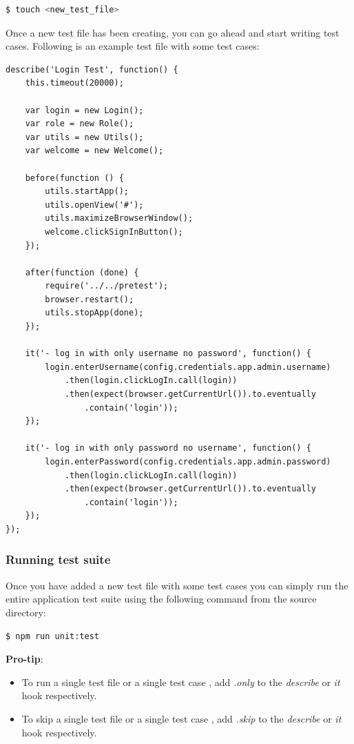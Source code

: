 \documentclass[fontsize=12pt,paper=letter,twoside]{scrartcl}
\begin{document}
\begin{lstlisting}[language=bash]
  $ touch <new_test_file>
\end{lstlisting}

\bigskip
\noindent Once a new test file has been creating, you can go ahead and start writing test cases. Following is an example test file with some test cases:\\

\begin{lstlisting}
describe('Login Test', function() {
	this.timeout(20000);

	var login = new Login();
	var role = new Role();
	var utils = new Utils();
	var welcome = new Welcome();

	before(function () {
		utils.startApp();
		utils.openView('#');
		utils.maximizeBrowserWindow();
		welcome.clickSignInButton();
	});

	after(function (done) {
		require('../../pretest');
		browser.restart();
		utils.stopApp(done);
	});

	it('- log in with only username no password', function() {
		login.enterUsername(config.credentials.app.admin.username)
			.then(login.clickLogIn.call(login))
			.then(expect(browser.getCurrentUrl()).to.eventually
				.contain('login'));
	});
    
	it('- log in with only password no username', function() {
		login.enterPassword(config.credentials.app.admin.password)
			.then(login.clickLogIn.call(login))
			.then(expect(browser.getCurrentUrl()).to.eventually
				.contain('login'));
	});
});
\end{lstlisting}

\newpage
\subsubsection{Running test suite}
Once you have added a new test file with some test cases you can simply run the entire application test suite using the following command from the source directory:

\begin{lstlisting}[language=bash]
	$ npm run unit:test
\end{lstlisting}

\bigskip
\noindent \textbf{Pro-tip}: 
\begin{itemize}
\item To run a single test file or a single test case , add \emph{.only} to the \emph{describe} or \emph{it} hook respectively.
\item To skip a single test file or a single test case , add \emph{.skip} to the \emph{describe} or \emph{it} hook respectively.  
\end{itemize}
\end{document}
